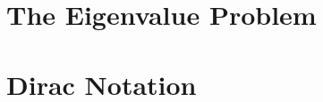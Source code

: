 \documentclass[12pt,letterpaper]{book}
\begin{document}





\section{The Eigenvalue Problem}


\section{Dirac Notation}


\end{document}
